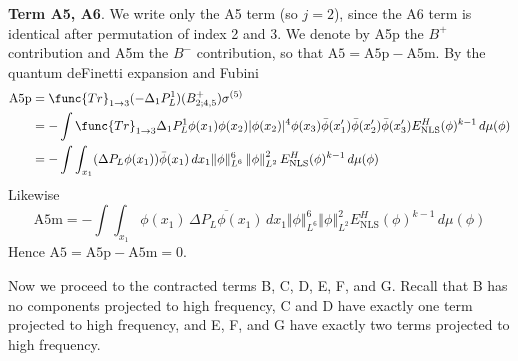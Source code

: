 \documentclass[12pt,letterpaper,leqno]{amsart}
\theoremstyle{plain}
\numberwithin{equation}{section}
\numberwithin{theorem}{section}
\numberwithin{proposition}{section}
\numberwithin{lemma}{section}
\numberwithin{corollary}{section}
\begin{document}
\noindent \textbf{Term A5, A6}. We write only the A5 term (so $j=2$), since
the A6 term is identical after permutation of index 2 and 3. We denote by
A5p the $B^{+}$ contribution and A5m the $B^{-}$ contribution, so that A$%
\text{5}=\text{A5p}-\text{A5m}$. By the quantum deFinetti expansion and
Fubini 
\begin{align*}
\text{A5p}& =\func{Tr}_{1\rightarrow 3}(-\Delta
_{1}P_{L}^{1})(B_{2;4,5}^{+})\sigma ^{(5)} \\
& =-\int \func{Tr}_{1\rightarrow 3}\Delta _{1}P_{L}^{1}\phi (x_{1})\phi
(x_{2})|\phi (x_{2})|^{4}\phi (x_{3})\bar{\phi}(x_{1}^{\prime })\bar{\phi}%
(x_{2}^{\prime })\bar{\phi}(x_{3}^{\prime })E_{\text{NLS}}^{H}(\phi
)^{k-1}\,d\mu (\phi ) \\
& =-\int \int_{x_{1}}(\Delta P_{L}\phi (x_{1}))\bar{\phi}(x_{1})\,dx_{1}%
\Vert \phi \Vert _{L^{6}}^{6}\left\Vert \phi \right\Vert _{L^{2}}^{2}E_{%
\text{NLS}}^{H}(\phi )^{k-1}\,d\mu (\phi )
\end{align*}%
Likewise 
\begin{equation*}
\text{A5m}=-\int \int_{x_{1}}\phi (x_{1})\,\overline{\Delta P_{L}\phi (x_{1})%
}\,dx_{1}\Vert \phi \Vert _{L^{6}}^{6}\left\Vert \phi \right\Vert
_{L^{2}}^{2}E_{\text{NLS}}^{H}(\phi )^{k-1}\,d\mu (\phi )
\end{equation*}%
Hence $\text{A5}=\text{A5p}-\text{A5m}=0$.

Now we proceed to the contracted terms B, C, D, E, F, and G. Recall that B
has no components projected to high frequency, C and D have exactly one term
projected to high frequency, and E, F, and G have exactly two terms
projected to high frequency.
\end{document}
